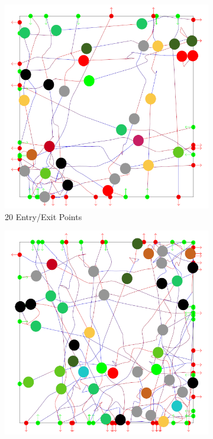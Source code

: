 \begin{figure}[t]
\begin{subfigure}[b]{0.24\linewidth}
	\includegraphics[width=\linewidth]{images/res-20-entry-exit.png}
	\caption{20 Entry/Exit Points}
 \end{subfigure}
%
 \begin{subfigure}[b]{0.24\linewidth}
	\includegraphics[width=\linewidth]{images/res-30-entry-exit.png}

\end{subfigure}
\end{figure}
